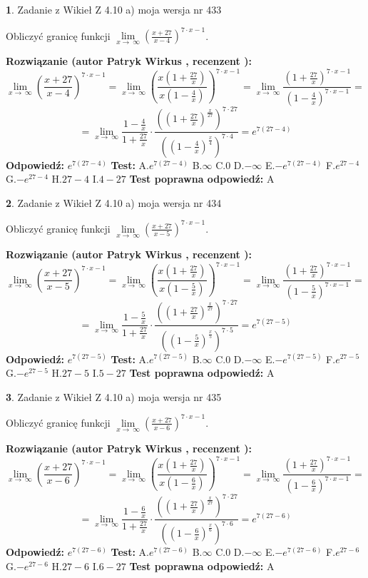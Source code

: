 \documentclass[12pt, a4paper]{article}
\theoremstyle{definition} %
\newtheorem{zad}{}
\newcommand{\zadStart}[1]{\begin{zad}#1\newline}
\newcommand{\zadStop}{\end{zad}}
\newcommand{\rozwStart}[2]{\noindent \textbf{Rozwiązanie (autor #1 , recenzent #2): }\newline}
\newcommand{\rozwStop}{\newline}
\newcommand{\odpStart}{\noindent \textbf{Odpowiedź:}\newline}
\newcommand{\odpStop}{\newline}
\newcommand{\testStart}{\noindent \textbf{Test:}\newline}
\newcommand{\testStop}{\newline}
\newcommand{\kluczStart}{\noindent \textbf{Test poprawna odpowiedź:}\newline}
\newcommand{\kluczStop}{\newline}
\begin{document}
\zadStart{Zadanie z Wikieł Z 4.10 a) moja wersja nr 433}


Obliczyć granicę funkcji  $\lim\limits_{x\to\ \infty}(\frac{x+27}{x-4})^{7\cdot x-1}$.
\zadStop
\rozwStart{Patryk Wirkus}{}
$$\lim\limits_{x\to\ \infty}(\frac{x+27}{x-4})^{7\cdot x-1} = \lim\limits_{x\to\ \infty}(\frac{x(1+\frac{27}{x})}{x(1-\frac{4}{x})})^{7\cdot x-1}=\lim\limits_{x\to\ \infty}\frac{(1+\frac{27}{x})^{7\cdot x-1}}{(1-\frac{4}{x})^{7\cdot x-1}}=$$
$$=\lim\limits_{x\to\ \infty}\frac{1-\frac{4}{x}}{1+\frac{27}{x}}\cdot\frac{((1+\frac{27}{x})^{\frac{x}{27}})^{7\cdot27}}{((1-\frac{4}{x})^{\frac{x}{4}})^{7\cdot4}}=e^{7(27-4)}$$
\rozwStop
\odpStart
$e^{7(27-4)}$
\odpStop
\testStart
A.$e^{7(27-4)}$ B.$\infty$ C.$0$ D.$-\infty$ E.$-e^{7(27-4)}$
F.$e^{27-4}$ G.$-e^{27-4}$
H.$27-4$
I.$4-27$
\testStop
\kluczStart
A
\kluczStop



\zadStart{Zadanie z Wikieł Z 4.10 a) moja wersja nr 434}


Obliczyć granicę funkcji  $\lim\limits_{x\to\ \infty}(\frac{x+27}{x-5})^{7\cdot x-1}$.
\zadStop
\rozwStart{Patryk Wirkus}{}
$$\lim\limits_{x\to\ \infty}(\frac{x+27}{x-5})^{7\cdot x-1} = \lim\limits_{x\to\ \infty}(\frac{x(1+\frac{27}{x})}{x(1-\frac{5}{x})})^{7\cdot x-1}=\lim\limits_{x\to\ \infty}\frac{(1+\frac{27}{x})^{7\cdot x-1}}{(1-\frac{5}{x})^{7\cdot x-1}}=$$
$$=\lim\limits_{x\to\ \infty}\frac{1-\frac{5}{x}}{1+\frac{27}{x}}\cdot\frac{((1+\frac{27}{x})^{\frac{x}{27}})^{7\cdot27}}{((1-\frac{5}{x})^{\frac{x}{5}})^{7\cdot5}}=e^{7(27-5)}$$
\rozwStop
\odpStart
$e^{7(27-5)}$
\odpStop
\testStart
A.$e^{7(27-5)}$ B.$\infty$ C.$0$ D.$-\infty$ E.$-e^{7(27-5)}$
F.$e^{27-5}$ G.$-e^{27-5}$
H.$27-5$
I.$5-27$
\testStop
\kluczStart
A
\kluczStop



\zadStart{Zadanie z Wikieł Z 4.10 a) moja wersja nr 435}


Obliczyć granicę funkcji  $\lim\limits_{x\to\ \infty}(\frac{x+27}{x-6})^{7\cdot x-1}$.
\zadStop
\rozwStart{Patryk Wirkus}{}
$$\lim\limits_{x\to\ \infty}(\frac{x+27}{x-6})^{7\cdot x-1} = \lim\limits_{x\to\ \infty}(\frac{x(1+\frac{27}{x})}{x(1-\frac{6}{x})})^{7\cdot x-1}=\lim\limits_{x\to\ \infty}\frac{(1+\frac{27}{x})^{7\cdot x-1}}{(1-\frac{6}{x})^{7\cdot x-1}}=$$
$$=\lim\limits_{x\to\ \infty}\frac{1-\frac{6}{x}}{1+\frac{27}{x}}\cdot\frac{((1+\frac{27}{x})^{\frac{x}{27}})^{7\cdot27}}{((1-\frac{6}{x})^{\frac{x}{6}})^{7\cdot6}}=e^{7(27-6)}$$
\rozwStop
\odpStart
$e^{7(27-6)}$
\odpStop
\testStart
A.$e^{7(27-6)}$ B.$\infty$ C.$0$ D.$-\infty$ E.$-e^{7(27-6)}$
F.$e^{27-6}$ G.$-e^{27-6}$
H.$27-6$
I.$6-27$
\testStop
\kluczStart
A
\kluczStop
\end{document}
